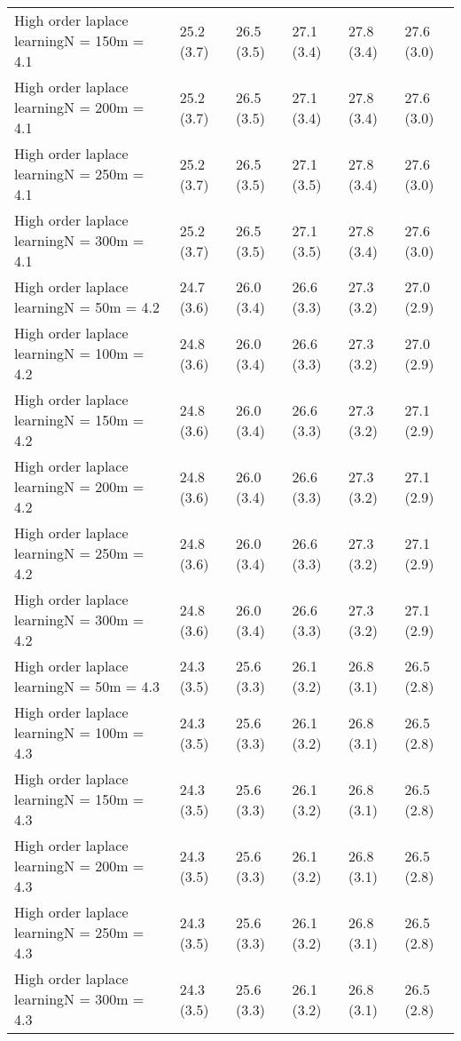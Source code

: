 \documentclass{article}
\begin{document}
\begin{table*}[t!]
\begin{center}
\begin{small}
\begin{sc}
\begin{tabular}{llllll}
High order laplace learningN = 150m = 4.1&25.2 (3.7)      &26.5 (3.5)      &27.1 (3.4)      &27.8 (3.4)      &27.6 (3.0)      \\
High order laplace learningN = 200m = 4.1&25.2 (3.7)      &26.5 (3.5)      &27.1 (3.4)      &27.8 (3.4)      &27.6 (3.0)      \\
High order laplace learningN = 250m = 4.1&25.2 (3.7)      &26.5 (3.5)      &27.1 (3.5)      &27.8 (3.4)      &27.6 (3.0)      \\
High order laplace learningN = 300m = 4.1&25.2 (3.7)      &26.5 (3.5)      &27.1 (3.5)      &27.8 (3.4)      &27.6 (3.0)      \\
High order laplace learningN = 50m = 4.2&24.7 (3.6)      &26.0 (3.4)      &26.6 (3.3)      &27.3 (3.2)      &27.0 (2.9)      \\
High order laplace learningN = 100m = 4.2&24.8 (3.6)      &26.0 (3.4)      &26.6 (3.3)      &27.3 (3.2)      &27.0 (2.9)      \\
High order laplace learningN = 150m = 4.2&24.8 (3.6)      &26.0 (3.4)      &26.6 (3.3)      &27.3 (3.2)      &27.1 (2.9)      \\
High order laplace learningN = 200m = 4.2&24.8 (3.6)      &26.0 (3.4)      &26.6 (3.3)      &27.3 (3.2)      &27.1 (2.9)      \\
High order laplace learningN = 250m = 4.2&24.8 (3.6)      &26.0 (3.4)      &26.6 (3.3)      &27.3 (3.2)      &27.1 (2.9)      \\
High order laplace learningN = 300m = 4.2&24.8 (3.6)      &26.0 (3.4)      &26.6 (3.3)      &27.3 (3.2)      &27.1 (2.9)      \\
High order laplace learningN = 50m = 4.3&24.3 (3.5)      &25.6 (3.3)      &26.1 (3.2)      &26.8 (3.1)      &26.5 (2.8)      \\
High order laplace learningN = 100m = 4.3&24.3 (3.5)      &25.6 (3.3)      &26.1 (3.2)      &26.8 (3.1)      &26.5 (2.8)      \\
High order laplace learningN = 150m = 4.3&24.3 (3.5)      &25.6 (3.3)      &26.1 (3.2)      &26.8 (3.1)      &26.5 (2.8)      \\
High order laplace learningN = 200m = 4.3&24.3 (3.5)      &25.6 (3.3)      &26.1 (3.2)      &26.8 (3.1)      &26.5 (2.8)      \\
High order laplace learningN = 250m = 4.3&24.3 (3.5)      &25.6 (3.3)      &26.1 (3.2)      &26.8 (3.1)      &26.5 (2.8)      \\
High order laplace learningN = 300m = 4.3&24.3 (3.5)      &25.6 (3.3)      &26.1 (3.2)      &26.8 (3.1)      &26.5 (2.8)      \\

\end{tabular}
\end{sc}
\end{small}
\end{center}
\end{table*}
\end{document}
